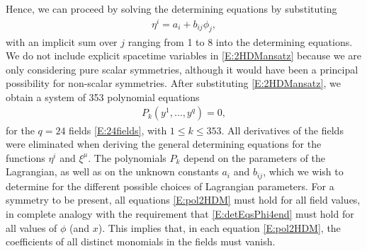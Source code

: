 \documentclass[a4paper,hidelinks, 12pt]{article}
\numberwithin{equation}{section}
\theoremstyle{plain}
\begin{document}
Hence, we can proceed by solving the determining equations by substituting
\begin{align}\label{E:2HDMansatz}
	\eta^i= a_i+b_{ij}\phi_j,
\end{align}
  with an implicit sum over $j$ ranging from 1 to 8 into the determining equations. We do not include explicit spacetime variables
	in \eqref{E:2HDMansatz} because we are only considering pure scalar symmetries, although it would have been a principal possibility for non-scalar symmetries. After substituting \eqref{E:2HDMansatz}, we obtain a system of 353 polynomial
equations
\begin{align}\label{E:pol2HDM}
  P_k(y^1,\ldots,y^{q}) = 0,
\end{align}
for the $q=24$ fields \eqref{E:24fields}, with $1 \leq k \leq 353$.
All derivatives of the fields were eliminated when deriving the general
determining equations for the functions $\eta^i$ and $\xi^\mu$. The
polynomials $P_k$ depend on the parameters of the Lagrangian, as well as on
the unknown constants $a_i$ and $b_{ij}$, which we wish to determine for the
different possible choices of Lagrangian parameters. For a symmetry to be
present, all equations \eqref{E:pol2HDM} must hold for all field values, in
complete analogy with the requirement that \eqref{E:detEqsPhi4end} must hold for
all values of $\phi$ (and $x$). This implies that, in each equation
\eqref{E:pol2HDM}, the coefficients of all distinct monomials in the fields
must vanish.
\end{document}
